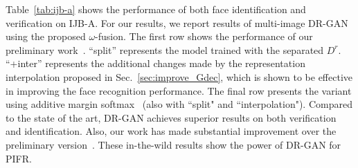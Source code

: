 \documentclass[10pt,journal,compsoc]{IEEEtran}
\begin{document}
Table~\ref{tab:ijb-a} shows the performance of both face identification and verification on IJB-A.
For our results, we report results of multi-image DR-GAN using the proposed $\omega$-fusion.
The first row shows the performance of our preliminary work~\cite{tran2017disentangled}.
``split'' represents the model trained with the separated $D^r$.
``+inter'' represents the additional changes made by the representation interpolation proposed in Sec.~\ref{sec:improve_Gdec}, which is shown to be effective in improving the face recognition performance. 
The final row presents the variant using additive margin softmax~\cite{wang2018additive} (also with ``split" and ``interpolation"). 
Compared to the state of the art, DR-GAN achieves superior results on both verification and identification. 
Also, our work has made substantial improvement over the preliminary version~\cite{tran2017disentangled}. 
These in-the-wild results show the power of DR-GAN for PIFR.
\end{document}
